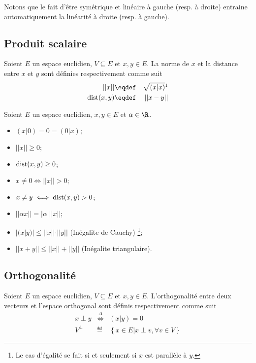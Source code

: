 \begin{myrem}
	Notons que le fait d'être symétrique et linéaire à gauche (resp. à droite) entraine automatiquement la linéarité à droite (resp. à gauche).
\end{myrem}

\subsection{Produit scalaire}

\begin{mydef}
	Soient $E$ un espace euclidien, $V \subseteq E$ et $x,y \in E$.
	La norme de $x$ et la distance entre $x$ et $y$ sont définies respectivement comme suit
	\begin{eqnarray*}
		||x|| & \eqdef & \sqrt{(x|x)}\footnotemark\\
		\dist(x, y) & \eqdef & ||x - y||\\
	\end{eqnarray*}
\end{mydef}

\begin{myprop}
	Soient $E$ un espace euclidien, $x,y \in E$ et $\alpha \in \R$.
	\begin{itemize}
		\item $(x|0) = 0 = (0|x)$;
		\item $||x|| \geq 0$;
		\item $\operatorname{dist}(x, y) \geq 0$;
		\item $x \neq 0 \iff ||x|| > 0$;
		\item $x \neq y \iff \operatorname{dist}(x, y) > 0$;
		\item $||\alpha x|| = |\alpha|||x||$;
		\item $|(x | y)| \leq ||x||\cdot||y||$ (Inégalite de Cauchy)
			\footnote{Le cas d'égalité se fait si et seulement si $x$ est parallèle à $y$.};
		\item $||x + y|| \leq ||x|| + ||y||$ (Inégalite triangulaire).
	\end{itemize}
\end{myprop}

\subsection{Orthogonalité}

\begin{mydef}
	Soient $E$ un espace euclidien, $V \subseteq E$ et $x,y \in E$.
	L'orthogonalité entre deux vecteurs et l'espace orthogonal sont définis respectivement comme suit
	\begin{eqnarray*}
		x \perp y & \stackrel{\Delta}{\Leftrightarrow} & (x|y) = 0\\
		V^{\perp} & \eqdef & \left\{x \in E | x \perp v, \forall v \in V\right\}
	\end{eqnarray*}
\end{mydef}

